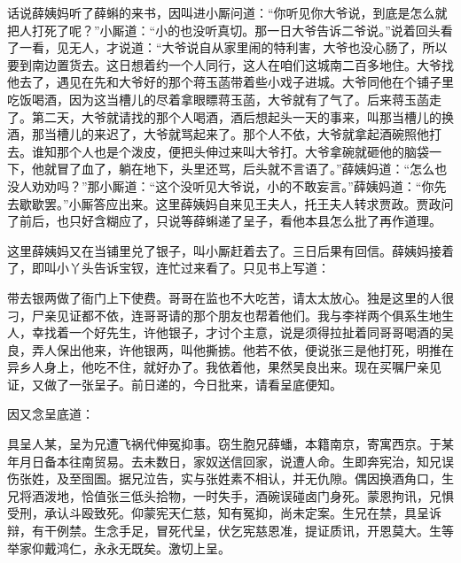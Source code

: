 


\begin{parag}
    话说薛姨妈听了薛蝌的来书，因叫进小厮问道：“你听见你大爷说，到底是怎么就把人打死了呢？”小厮道：“小的也没听真切。那一日大爷告诉二爷说。”说着回头看了一看，见无人，才说道：“大爷说自从家里闹的特利害，大爷也没心肠了，所以要到南边置货去。这日想着约一个人同行，这人在咱们这城南二百多地住。大爷找他去了，遇见在先和大爷好的那个蒋玉菡带着些小戏子进城。大爷同他在个铺子里吃饭喝酒，因为这当槽儿的尽着拿眼瞟蒋玉菡，大爷就有了气了。后来蒋玉菡走了。第二天，大爷就请找的那个人喝酒，酒后想起头一天的事来，叫那当槽儿的换酒，那当槽儿的来迟了，大爷就骂起来了。那个人不依，大爷就拿起酒碗照他打去。谁知那个人也是个泼皮，便把头伸过来叫大爷打。大爷拿碗就砸他的脑袋一下，他就冒了血了，躺在地下，头里还骂，后头就不言语了。”薛姨妈道：“怎么也没人劝劝吗？”那小厮道：“这个没听见大爷说，小的不敢妄言。”薛姨妈道：“你先去歇歇罢。”小厮答应出来。这里薛姨妈自来见王夫人，托王夫人转求贾政。贾政问了前后，也只好含糊应了，只说等薛蝌递了呈子，看他本县怎么批了再作道理。
\end{parag}


\begin{parag}
    这里薛姨妈又在当铺里兑了银子，叫小厮赶着去了。三日后果有回信。薛姨妈接着了，即叫小丫头告诉宝钗，连忙过来看了。只见书上写道：
\end{parag}


\begin{parag}
    带去银两做了衙门上下使费。哥哥在监也不大吃苦，请太太放心。独是这里的人很刁，尸亲见证都不依，连哥哥请的那个朋友也帮着他们。我与李祥两个俱系生地生人，幸找着一个好先生，许他银子，才讨个主意，说是须得拉扯着同哥哥喝酒的吴良，弄人保出他来，许他银两，叫他撕掳。他若不依，便说张三是他打死，明推在异乡人身上，他吃不住，就好办了。我依着他，果然吴良出来。现在买嘱尸亲见证，又做了一张呈子。前日递的，今日批来，请看呈底便知。
\end{parag}


\begin{parag}
    因又念呈底道：
\end{parag}


\begin{qute2sp}
    具呈人某，呈为兄遭飞祸代伸冤抑事。窃生胞兄薛蟠，本籍南京，寄寓西京。于某年月日备本往南贸易。去未数日，家奴送信回家，说遭人命。生即奔宪治，知兄误伤张姓，及至囹圄。据兄泣告，实与张姓素不相认，并无仇隙。偶因换酒角口，生兄将酒泼地，恰值张三低头拾物，一时失手，酒碗误碰卤门身死。蒙恩拘讯，兄惧受刑，承认斗殴致死。仰蒙宪天仁慈，知有冤抑，尚未定案。生兄在禁，具呈诉辩，有干例禁。生念手足，冒死代呈，伏乞宪慈恩准，提证质讯，开恩莫大。生等举家仰戴鸿仁，永永无既矣。激切上呈。
\end{qute2sp}



